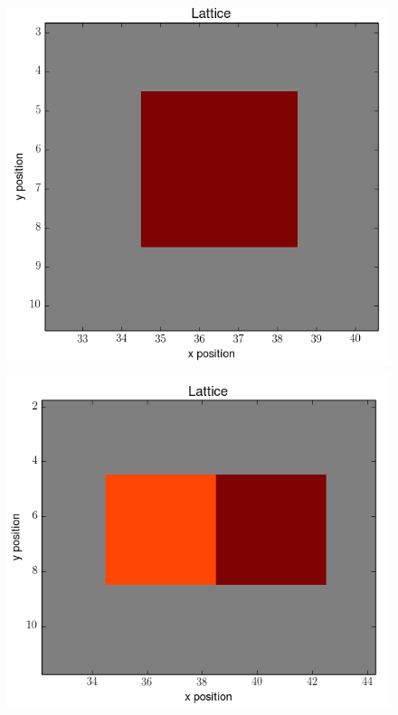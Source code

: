 \documentclass[12pt]{article}
\begin{document}
\begin{figure}[h]
	\centering
	\includegraphics[scale=0.20]{img/1ctc-start}
	\includegraphics[scale=0.20]{img/2horz-start}

\end{figure}
\end{document}
